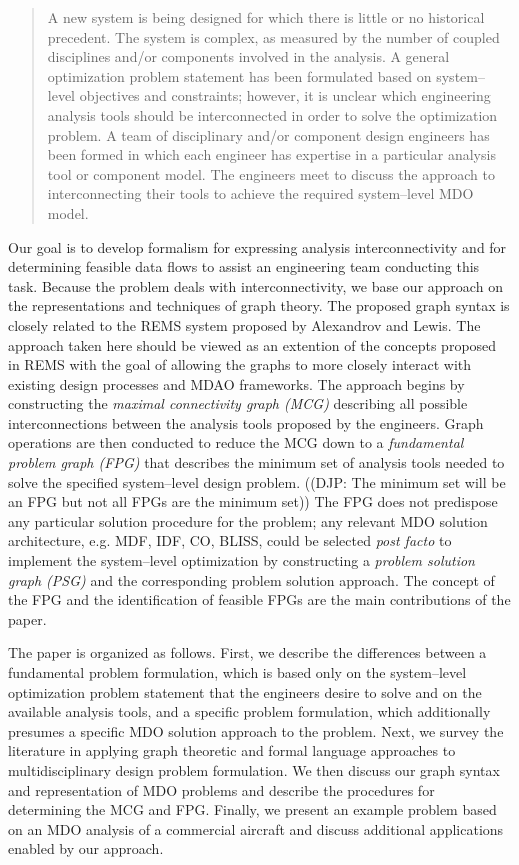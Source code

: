     \begin{quote}
    A new system is being designed for which there is little or no historical precedent. The system
    is complex, as measured by the number of coupled disciplines and/or components involved in the
    analysis. A general optimization problem statement has been formulated based on system--level objectives and constraints; however, it is unclear which engineering analysis tools should
    be interconnected in order to solve the optimization problem. A team of disciplinary and/or component design engineers has been formed in which each engineer has expertise in a
    particular analysis tool or component model. The engineers meet to discuss the approach to
    interconnecting their tools to achieve the required system--level MDO model.
    \end{quote}

    Our goal is to develop formalism for expressing analysis interconnectivity and for determining feasible
    data flows to assist an engineering team conducting this task. Because the problem deals with
    interconnectivity, we base our approach on the representations and techniques of graph theory. The 
    proposed graph syntax is closely related to the REMS system proposed by 
    Alexandrov and Lewis\cite{alexandrov2004}. The approach taken here should be viewed as an extention 
    of the concepts proposed in REMS with the goal of allowing the graphs to more closely interact with 
    existing design processes and MDAO frameworks. The approach begins by 
    constructing the \emph{maximal connectivity graph (MCG)} describing all possible
    interconnections between the analysis tools proposed by the engineers. Graph operations are then
    conducted to reduce the MCG down to a \emph{fundamental problem graph (FPG)} that describes the minimum set of analysis
    tools needed to solve the specified system--level design problem. ((DJP: The minimum set will be an FPG but not all FPGs are the minimum set)) The FPG does not predispose
    any particular solution procedure for the problem; any relevant MDO solution architecture, e.g. MDF,
    IDF, CO, BLISS, could be selected \emph{post facto} to implement the system--level optimization by
    constructing a \emph{problem solution graph (PSG)} and the corresponding problem solution approach.
    The concept of the FPG and the identification of feasible FPGs are the main contributions of the paper.

    The paper is organized as follows. First, we describe the differences between a fundamental problem
    formulation, which is based only on the system--level optimization problem statement that the
    engineers desire to solve and on the available analysis tools, and a specific problem formulation, which
    additionally presumes a specific MDO solution approach to the problem. Next, we survey the literature in applying
    graph theoretic and formal language approaches to multidisciplinary design problem formulation. 
    We then discuss our graph syntax and representation of MDO problems and describe the procedures for 
    determining the MCG and FPG. Finally, we present an example problem based on an MDO analysis of a 
    commercial aircraft and discuss additional applications enabled by our approach.


